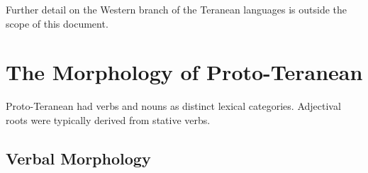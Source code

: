 \documentclass[grammar]{subfiles}
\begin{document}
Further detail on the Western branch of the Teranean languages is outside the
scope of this document.

%


%



\section{The Morphology of Proto-Teranean}
\label{sec:history:proto_teranean:morphology}

Proto-Teranean had verbs and nouns as distinct lexical categories.  Adjectival
roots were typically derived from stative verbs.


\subsection{Verbal Morphology}
\label{ssec:history:pt:verbal_morphology}
\end{document}
